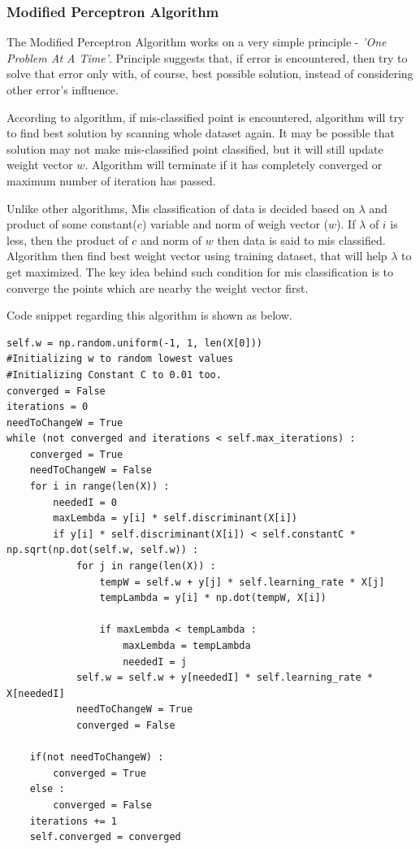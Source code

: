 \documentclass{article}
\begin{document}
\subsubsection{Modified Perceptron Algorithm}
The Modified Perceptron Algorithm works on a very simple principle - \textit{'One Problem At A Time'}. Principle suggests that, if error is encountered, then try to solve that error only with, of course, best possible solution, instead of considering other error's influence. \par According to algorithm, if mis-classified point is encountered, algorithm will try to find best solution by scanning whole dataset again. It may be possible that solution may not make mis-classified point classified, but it will still update weight vector \(w\). Algorithm will terminate if it has completely converged or maximum number of iteration has passed. 
\par Unlike other algorithms, Mis classification of data is decided based on  \(\lambda\) and product of some constant(\(c\)) variable and norm of weigh vector (\(w\)). If \(\lambda\) of \(i\) is less, then the product of \(c\) and norm of \(w\) then data is said to mis classified. Algorithm then find best weight vector using training dataset, that will help \(\lambda\) to get maximized. The key idea behind such condition for mis classification is to converge the points which are nearby the weight vector first.
\par Code snippet regarding this algorithm is shown as below.
\begin{lstlisting}
self.w = np.random.uniform(-1, 1, len(X[0]))
#Initializing w to random lowest values
#Initializing Constant C to 0.01 too.
converged = False
iterations = 0
needToChangeW = True
while (not converged and iterations < self.max_iterations) :
    converged = True
    needToChangeW = False
    for i in range(len(X)) :
        neededI = 0
        maxLembda = y[i] * self.discriminant(X[i])
        if y[i] * self.discriminant(X[i]) < self.constantC * np.sqrt(np.dot(self.w, self.w)) :
            for j in range(len(X)) :
                tempW = self.w + y[j] * self.learning_rate * X[j]
                tempLambda = y[i] * np.dot(tempW, X[i])
        
                if maxLembda < tempLambda :
                    maxLembda = tempLambda
                    neededI = j
            self.w = self.w + y[neededI] * self.learning_rate * X[neededI]
            needToChangeW = True
            converged = False

    if(not needToChangeW) :
        converged = True
    else :
        converged = False
    iterations += 1
    self.converged = converged
        
\end{lstlisting}
\end{document}
